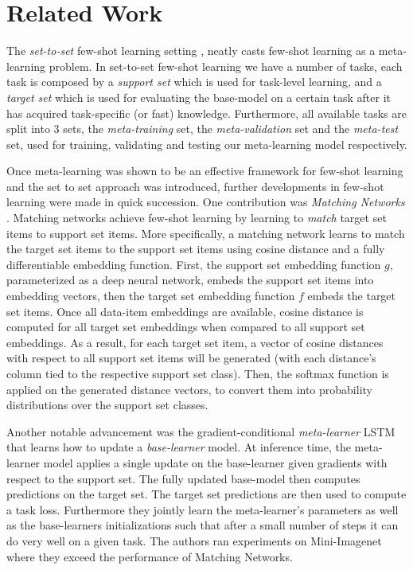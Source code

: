 \documentclass{article} \usepackage[dvipsnames]{xcolor}
\begin{document}
\section{Related Work}

The \emph{set-to-set} few-shot learning setting \citep{vinyals2016matching}, neatly casts few-shot learning as a meta-learning problem. In set-to-set few-shot learning we have a number of tasks, each task is composed by a \emph{support set} which is used for task-level learning, and a \emph{target set} which is used for evaluating the base-model on a certain task after it has acquired task-specific (or fast) knowledge. Furthermore, all available tasks are split into 3 sets, the \emph{meta-training} set, the \emph{meta-validation} set and the \emph{meta-test} set, used for training, validating and testing our meta-learning model respectively. 



Once meta-learning was shown to be an effective framework for few-shot learning and the set to set approach was introduced, further developments in few-shot learning were made in quick succession. One contribution was \emph{Matching Networks} \citep{vinyals2016matching}. Matching networks achieve few-shot learning by learning to \emph{match} target set items to support set items. More specifically, a matching network learns to match the target set items to the support set items using cosine distance and a fully differentiable embedding function.  First, the support set embedding function $g$, parameterized as a deep neural network, embeds the support set items into embedding vectors, then the target set embedding function $f$ embeds the target set items. Once all data-item embeddings are available, cosine distance is computed for all target set embeddings when compared to all support set embeddings. As a result, for each target set item, a vector of cosine distances with respect to all support set items will be generated (with each distance's column tied to the respective support set class). Then, the softmax function is applied on the generated distance vectors, to convert them into probability distributions over the support set classes. 

Another notable advancement was the gradient-conditional \emph{meta-learner} LSTM \citep{ravi2016optimization} that learns how to update a \emph{base-learner} model. At inference time, the meta-learner model applies a single update on the base-learner given gradients with respect to the support set. The fully updated base-model then computes predictions on the target set. The target set predictions are then used to compute a task loss. Furthermore they jointly learn the meta-learner's parameters as well as the base-learners initializations such that after a small number of steps it can do very well on a given task. The authors ran experiments on Mini-Imagenet where they exceed the performance of Matching Networks.
\end{document}
